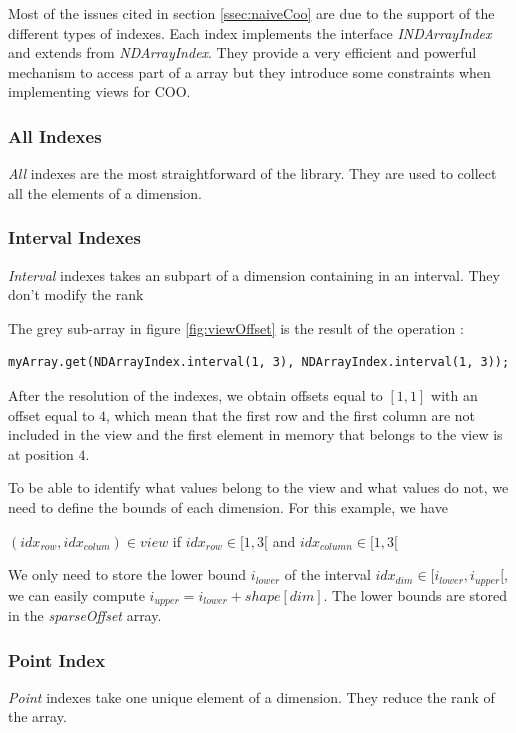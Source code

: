 Most of the issues cited in section \ref{ssec:naiveCoo} are due to the support of the different types of indexes. Each index implements the interface \textit{INDArrayIndex} and extends from \textit{NDArrayIndex}. They provide a very efficient and powerful mechanism to access part of a array but they introduce some constraints when implementing views for COO.

\subsubsection{All Indexes}
\textit{All} indexes are the most straightforward of the library. They are used to collect all the elements of a dimension.

\subsubsection{Interval Indexes}
\textit{Interval} indexes takes an subpart of a dimension containing in an interval. They don't modify the rank

The grey sub-array in figure \ref{fig:viewOffset} is the result of the operation :
\begin{lstlisting}[style=nonumbers]
	myArray.get(NDArrayIndex.interval(1, 3), NDArrayIndex.interval(1, 3));
\end{lstlisting} 
After the resolution of the indexes, we obtain offsets equal to $[1, 1]$ with an offset equal to $4$, which mean that the first row and the first column are not included in the view and the first element in memory that belongs to the view is at position $4$.

To be able to identify what values belong to the view and what values do not, we need to define the bounds of each dimension. For this example, we have

$(idx_{row}, idx_{colum}) \in view $  if  $idx_{row} \in [1, 3[$ and $idx_{column} \in [1, 3[$

We only need to store the lower bound $i_{lower}$ of the interval $idx_{dim} \in [i_{lower}, i_{upper}[$, we can easily compute $i_{upper} = i_{lower}+shape[dim]$.
The lower bounds are stored in the \textit{sparseOffset} array.

\subsubsection{Point Index}
\textit{Point} indexes take one unique element of a dimension. They reduce the rank of the array.

